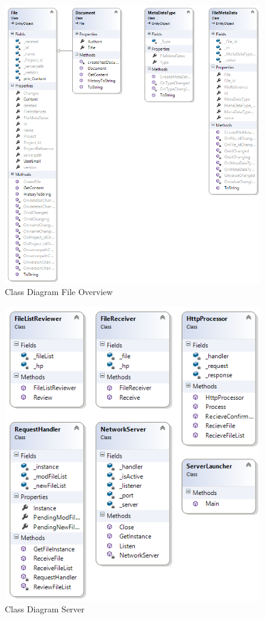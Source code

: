 \begin{figure}[H]
  \includegraphics[width=\textwidth]{illustrations/classDiagrams/FileOverviewRep_CD.png}
  \caption{Class Diagram File Overview}
\end{figure}
\begin{figure}[H]
  \includegraphics[width=\textwidth]{illustrations/classDiagrams/serverCD.png}
  \caption{Class Diagram Server}
\end{figure}

